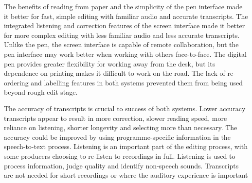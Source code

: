 The benefits of reading from paper and the simplicity of the pen interface made it better for fast, simple editing with
familiar audio and accurate transcripts.  The integrated listening and correction features of the screen interface made
it better for more complex editing with less familiar audio and less accurate transcripts.  Unlike the pen, the screen
interface is capable of remote collaboration, but the pen interface may work better when working with others
face-to-face.  The digital pen provides greater flexibility for working away from the desk, but its dependence on
printing makes it difficult to work on the road.  The lack of re-ordering and labelling features in both systems
prevented them from being used beyond rough edit stage.

The accuracy of transcripts is crucial to success of both systems. Lower accuracy transcripts appear to result in more
correction, slower reading speed, more reliance on listening, shorter longevity and selecting more than necessary. The
accuracy could be improved by using programme-specific information in the speech-to-text process.  Listening is an
important part of the editing process, with some producers choosing to re-listen to recordings in full.  Listening is
used to process information, judge quality and identify non-speech sounds. Transcripts are not needed for short
recordings or where the auditory experience is important

